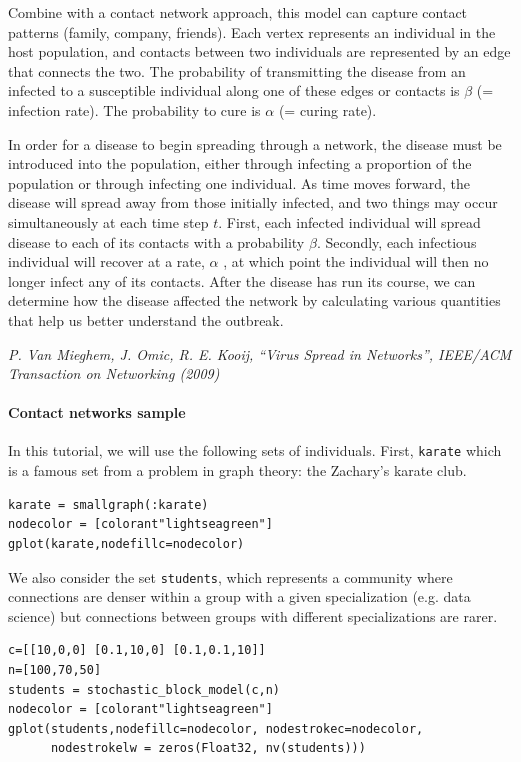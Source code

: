 \documentclass{article}
\begin{document}
Combine with a contact network approach, this model can capture contact patterns (family, company, friends). Each vertex represents an individual in the host population, and contacts between two individuals are represented by an edge that connects the two. The probability of transmitting the disease from an infected to a susceptible individual along one of these edges or contacts is $\beta$ (= infection rate). The probability to cure is $\alpha$ (= curing rate).

In order for a disease to begin spreading through a network, the disease must be introduced into the population, either through infecting a proportion of the population or through infecting one individual. As time moves forward, the disease will spread away from those initially infected, and two things may occur simultaneously at each time step $t$. First, each infected individual will spread disease to each of its contacts with a probability $\beta$. Secondly, each infectious individual will recover at a rate, $\alpha$ , at which point the individual will then no longer infect any of its contacts. After the disease has run its course, we can determine how the disease affected the network by calculating various quantities that help us better understand the outbreak. 

\medskip

\textit{P. Van Mieghem, J. Omic, R. E. Kooij, “Virus Spread in Networks”, IEEE/ACM Transaction on Networking (2009)}

\paragraph{Contact networks sample} In this tutorial, we will use the following sets of individuals. First, \texttt{karate} which is a famous set from a problem in graph theory: the Zachary's karate club.

\begin{verbatim}
karate = smallgraph(:karate)
nodecolor = [colorant"lightseagreen"]
gplot(karate,nodefillc=nodecolor)
\end{verbatim}

We also consider the set \texttt{students}, which represents a community where connections are denser within a group with a given specialization (e.g. data science) but connections between groups with different specializations are rarer.

\begin{verbatim}
c=[[10,0,0] [0.1,10,0] [0.1,0.1,10]]
n=[100,70,50]
students = stochastic_block_model(c,n)
nodecolor = [colorant"lightseagreen"]
gplot(students,nodefillc=nodecolor, nodestrokec=nodecolor, 
      nodestrokelw = zeros(Float32, nv(students)))
\end{verbatim}
\end{document}
